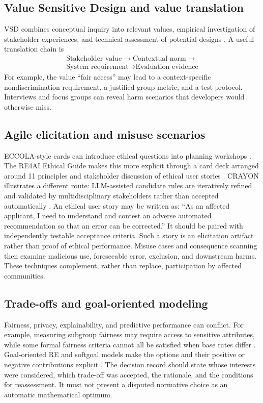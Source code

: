 \documentclass[11pt,a4paper]{article}
\begin{document}
\subsection{Value Sensitive Design and value translation}
VSD combines conceptual inquiry into relevant values, empirical investigation of stakeholder experiences, and technical assessment of potential designs \cite{friedman2013,umbrello2021}. A useful translation chain is
\[
\begin{gathered}\text{Stakeholder value}\rightarrow\text{Contextual norm}\rightarrow\\\text{System requirement}\rightarrow\text{Evaluation evidence}\end{gathered}
\]
For example, the value ``fair access'' may lead to a context-specific nondiscrimination requirement, a justified group metric, and a test protocol. Interviews and focus groups can reveal harm scenarios that developers would otherwise miss.

\subsection{Agile elicitation and misuse scenarios}
ECCOLA-style cards can introduce ethical questions into planning workshops \cite{vakkuri2021}. The RE4AI Ethical Guide makes this more explicit through a card deck arranged around 11 principles and stakeholder discussion of ethical user stories \cite{siqueira2022}. CRAYON illustrates a different route: LLM-assisted candidate rules are iteratively refined and validated by multidisciplinary stakeholders rather than accepted automatically \cite{abodinar2026}. An ethical user story may be written as: ``As an affected applicant, I need to understand and contest an adverse automated recommendation so that an error can be corrected.'' It should be paired with independently testable acceptance criteria. Such a story is an elicitation artifact rather than proof of ethical performance. Misuse cases and consequence scanning then examine malicious use, foreseeable error, exclusion, and downstream harms. These techniques complement, rather than replace, participation by affected communities.

\subsection{Trade-offs and goal-oriented modeling}
Fairness, privacy, explainability, and predictive performance can conflict. For example, measuring subgroup fairness may require access to sensitive attributes, while some formal fairness criteria cannot all be satisfied when base rates differ \cite{kleinberg2017}. Goal-oriented RE and softgoal models make the options and their positive or negative contributions explicit \cite{chung2000,yu1997}. The decision record should state whose interests were considered, which trade-off was accepted, the rationale, and the conditions for reassessment. It must not present a disputed normative choice as an automatic mathematical optimum.
\end{document}
